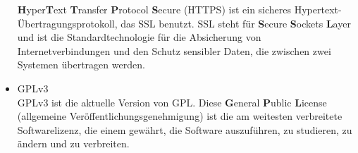 \documentclass[12 pt]{article}
\begin{document}
\begin{itemize}
	\textbf{H}yper\textbf{T}ext \textbf{T}ransfer \textbf{P}rotocol \textbf{S}ecure (HTTPS) ist ein sicheres Hypertext-Übertragungsprotokoll, das SSL benutzt.
	SSL steht für \textbf{S}ecure \textbf{S}ockets \textbf{L}ayer und ist die Standardtechnologie für die Absicherung von Internetverbindungen und den Schutz sensibler Daten, die zwischen zwei Systemen übertragen werden.
\item GPLv3 \\
	GPLv3 ist die aktuelle Version von GPL. Diese \textbf{G}eneral \textbf{P}ublic \textbf{L}icense (allgemeine Veröffentlichungsgenehmigung) ist die am weitesten verbreitete Softwarelizenz,
	die einem gewährt, die Software auszuführen, zu studieren, zu ändern und zu verbreiten.
\end{itemize}
\end{document}
